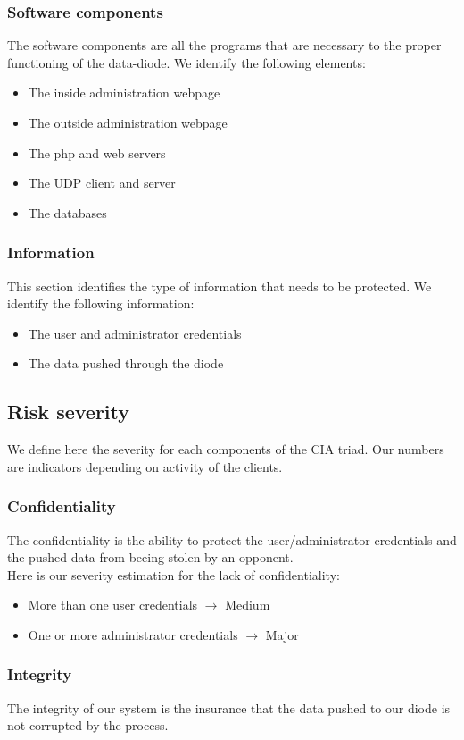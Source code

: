 \documentclass[a4paper,11pt]{article}
\begin{document}
\subsubsection{Software components}
The software components are all the programs that are necessary to the proper functioning of the data-diode. We identify the following elements:
\begin{itemize}
\item The inside administration webpage
\item The outside administration webpage
\item The php and web servers
\item The UDP client and server
\item The databases
\end{itemize}

\subsubsection{Information}
This section identifies the type of information that needs to be protected. We identify the following information:

\begin{itemize}
\item The user and administrator credentials
\item The data pushed through the diode
\end{itemize}
\subsection{Risk severity}
We define here the severity for each components of the CIA triad. Our numbers are indicators depending on activity of the clients.
\subsubsection{Confidentiality}
The confidentiality is the ability to protect the user/administrator credentials and the pushed data from beeing stolen by an opponent.\\
Here is our severity estimation for the lack of confidentiality:
\begin{itemize}
\item More than one user credentials $\rightarrow$ Medium
\item One or more administrator credentials $\rightarrow$ Major
\end{itemize}
\subsubsection{Integrity}
The integrity of our system is the insurance that the data pushed to our diode is not corrupted by the process.\\
\end{document}
